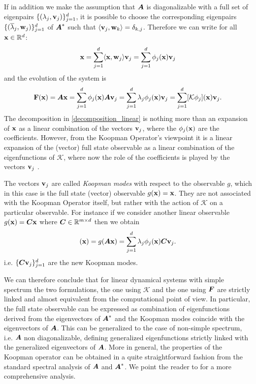 If in addition we make the assumption that $\vb*{A}$ is diagonalizable with a full set of eigenpairs $\{(\lambda_j, \vb{v}_j)\}_{j=1}^{d}$, it is possible to choose the corresponding eigenpairs $\{(\overline{\lambda}_j, \vb{w}_j)\}_{j=1}^{d}$ of $\vb*{A}^*$ such that $\langle \vb{v}_j, \vb{w}_k\rangle = \delta_{k,j}$. Therefore we can write for all $\vb{x}\in\mathbb{R}^d$:
\begin{equation}
    \label{decomposition_linear}
    \vb{x} = \sum_{j=1}^d \langle \vb{x}, \vb{w}_j\rangle \vb{v}_j = \sum_{j=1}^d \phi_j(\vb{x}) \vb{v}_j
\end{equation}
and the evolution of the system is
\begin{equation}
    \label{evolution_linear}
    \vb{F}(\vb{x}) = \vb*{A}\vb{x}  = \sum_{j=1}^d \phi_j(\vb{x}) \vb*{A}\vb{v}_j = \sum_{j=1}^d \lambda_j \phi_j(\vb{x}) \vb{v}_j = \sum_{j=1}^d [\mathcal{K}\phi_j](\vb{x})\vb{v}_j.
\end{equation}
The decomposition in \eqref{decomposition_linear} is nothing more than an expansion of $\vb{x}$ as a linear combination of the vectors $\vb{v}_j$, where the $\phi_j(\vb{x})$ are the coefficients. However, from the Koopman Operator's viewpoint it is a linear expansion of the (vector) full state observable as a linear combination of the eigenfunctions of $\mathcal{K}$, where now the role of the coefficients is played by the vectors $\vb{v}_j$ \cite{rowley_spectral_2009}. 

The vectors $\vb{v}_j$ are called \emph{Koopman modes} with respect to the observable $g$, which in this case is the full state (vector) observable $g(\vb{x}) = \vb{x}$. They are not associated with the Koopman Operator itself, but rather with the action of $\mathcal{K}$ on a particular observable. For instance if we consider another linear observable $g(\vb{x}) = \vb*{C}\vb{x}$ where $\vb*{C}\in\mathbb{R}^{m \times d}$ then we obtain
\begin{equation*}
	[\mathcal{K}g](\vb{x}) = g(\vb*{A}\vb{x})  = \sum_{j=1}^d \lambda_j \phi_j(\vb{x}) \vb*{C}\vb{v}_j.
\end{equation*}
i.e. $\{\vb*{C}\vb{v}_j\}_{j = 1}^d$ are the new Koopman modes.

We can therefore conclude that for linear dynamical systems with simple spectrum the two formulations, the one using $\mathcal{K}$ and the one using $\vb*{F}$ are strictly linked and almost equivalent from the computational point of view. In particular, the full state observable can be expressed as combination of eigenfunctions derived from the eigenvectors of $\vb*{A}^*$ and the Koopman modes coincide with the eigenvectors of $\vb*{A}$. This can be generalized to the case of non-simple spectrum, i.e. $\vb*{A}$ non diagonalizable, defining generalized eigenfunctions strictly linked with the generalized eigenvectors of $\vb*{A}$. More in general, the properties of the Koopman operator can be obtained in a quite straightforward fashion from the standard spectral analysis of $\vb*{A}$ and $\vb*{A}^*$. We point the reader to \cite{mezic_spectrum_2019} for a more comprehensive analysis.

